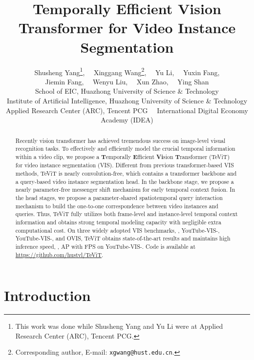 \documentclass[10pt,twocolumn,letterpaper]{article}
\begin{document}
\title{Temporally Efficient Vision Transformer for Video Instance Segmentation}

\author{Shusheng Yang\thanks{This work was done while Shusheng Yang and Yu Li were at Applied Research Center (ARC), Tencent PCG.}, \ \  Xinggang Wang\thanks{Corresponding author, E-mail: {\tt xgwang@hust.edu.cn}.}, \ \ Yu Li, \ \ Yuxin Fang, \\
Jiemin Fang, \ \ Wenyu Liu, \ \ Xun Zhao, \ \ Ying Shan \\
\normalsize 
School of EIC, Huazhong University of Science \& Technology \\
\normalsize 
Institute of Artificial Intelligence, Huazhong University of Science \& Technology \\
\normalsize 
Applied Research Center (ARC), Tencent PCG \ \ International Digital Economy Academy (IDEA) \\
}
\maketitle

\begin{abstract}
Recently vision transformer has achieved tremendous success on image-level visual recognition tasks. To effectively and efficiently model the crucial temporal information within a video clip, we propose a \textbf{T}emporally \textbf{E}fficient \textbf{Vi}sion \textbf{T}ransformer (TeViT) for video instance segmentation (VIS). Different from previous transformer-based VIS methods, TeViT is nearly convolution-free, which contains a transformer backbone and a query-based video instance segmentation head. In the backbone stage, we propose a nearly parameter-free messenger shift mechanism for early temporal context fusion. In the head stages, we propose a parameter-shared spatiotemporal query interaction mechanism to build the one-to-one correspondence between video instances and queries. Thus, TeViT fully utilizes both frame-level and instance-level temporal context information and obtains strong temporal modeling capacity with negligible extra computational cost. On three widely adopted VIS benchmarks, \ie, YouTube-VIS-, YouTube-VIS-, and OVIS, TeViT obtains state-of-the-art results and maintains high inference speed, \eg,  AP with  FPS on YouTube-VIS-. Code is available at \url{https://github.com/hustvl/TeViT}.
\end{abstract}

\section{Introduction}
\end{document}
